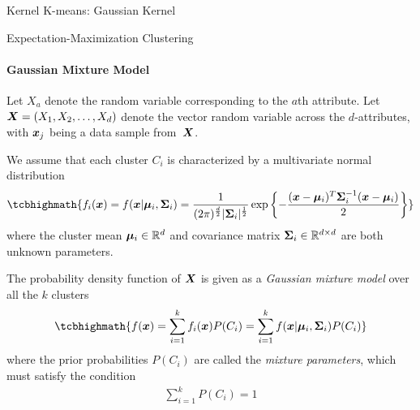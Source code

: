 \begin{frame}[fragile]{Kernel K-means: Gaussian Kernel}
\begin{center}
\begin{figure}
  \captionsetup[subfloat]{captionskip=0.25in}
    \centerline{
    }
\end{figure}
\end{center}
\end{frame}


\begin{frame}{Expectation-Maximization Clustering}
\framesubtitle{Gaussian Mixture Model}
\small
  Let $X_a$ denote the random variable corresponding to
the $a$th attribute. 
Let ${\boldsymbol X} = (X_1, X_2, \dots, X_d)$ denote the vector random
variable across the $d$-attributes, with ${\boldsymbol x}_{j}$ being a data
sample from~${\boldsymbol X}$.


\medskip
We assume that
each cluster $C_i$ is characterized by
a multivariate normal distribution
\begin{align*}
\tcbhighmath{
f_i(\bx) = f(\bx|\bmu_i,\cov_i)
= \frac{1}{(2\pi)^\frac{d}{2}|\cov_i|^\frac{1}{2}}
    \exp\lB\{-\frac{(\bx-\bmu_{i})^{T} \cov_i^{-1}
    (\bx-\bmu_{i})}{2}\rB\}
}
\end{align*}
where the cluster mean ${\bm \mu}_i \in {\mathord{\mathbb R}}^d$ and
covariance matrix
${\bm \Sigma}_i \in {\mathord{\mathbb R}}^{d \times d}$ are both unknown parameters.


\medskip
The probability density function of ${\boldsymbol X}$
is given as a
{\em Gaussian mixture model} over all the $k$ clusters
\begin{align*}
\tcbhighmath{
    f(\bx) = \sum_{i=1}^k f_i(\bx) P(C_i)
    = \sum_{i=1}^k f(\bx | \bmu_i, \cov_i) P(C_i)
}
\end{align*}
where the prior probabilities $P(C_i)$ are called the
{\em mixture parameters}, which must satisfy the condition
\begin{align*}
    \sum_{i=1}^k P(C_i) = 1
\end{align*}


\end{frame}




